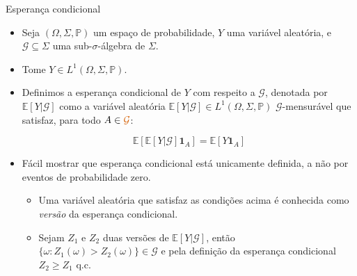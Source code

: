 \documentclass[11pt]{beamer}
\begin{document}
	\begin{frame}{Esperança condicional}
	\begin{itemize}
		\item Seja $(\Omega, \Sigma,\mathbb{P})$ um espaço de probabilidade, $Y$ uma variável aleatória, e $\mathcal{G}\subseteq \Sigma$ uma sub-$\sigma$-álgebra de $\Sigma$.
		\item Tome $Y \in L^1(\Omega, \Sigma,\mathbb{P})$.
		\item Definimos a esperança condicional de $Y$ com respeito a $\mathcal{G}$, denotada por $\mathbb{E}[Y|\mathcal{G}]$ como a {\color{blue}variável aleatória} $\mathbb{E}[Y|\mathcal{G}] \in L^1(\Omega, \Sigma,\mathbb{P})$ {\color{red}$\mathcal{G}$-mensurável} que satisfaz, para todo $A \in {\color{red}\mathcal{G}}$:
		
		$$\mathbb{E}[\mathbb{E}[Y|\mathcal{G}]\mathbf{1}_A] = \mathbb{E}[Y\mathbf{1}_A]$$
		\item Fácil mostrar que esperança condicional está unicamente definida, a não por eventos de probabilidade zero.
		\begin{itemize}
			\item Uma variável aleatória que satisfaz as condições acima é conhecida como \emph{versão} da esperança condicional.
			\item Sejam $Z_1$ e $Z_2$ duas versões de $\mathbb{E}[Y|\mathcal{G}]$, então $\{\omega: Z_1(\omega)>Z_2(\omega)\} \in \mathcal{G}$ e pela definição da esperança condicional $Z_2\geq Z_1$ q.c.
		\end{itemize}
	\end{itemize}
	\end{frame}
\end{document}
